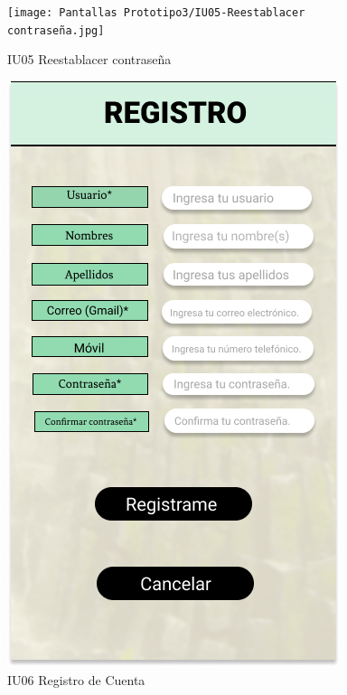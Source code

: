 \begin{figure}[h]
    \begin{minipage}{0.5\textwidth}
        \centering
        \texttt{[image: Pantallas Prototipo3/IU05-Reestablacer contraseña.jpg]}
        \caption{IU05 Reestablacer contraseña}
    \end{minipage}
    
    \begin{minipage}{0.5\textwidth}
        \centering
        \includegraphics[width=.7\linewidth]{Pantallas Prototipo3/IU06-Registro de Cuenta.jpg}
        \caption{IU06 Registro de Cuenta}
    \end{minipage}%
\end{figure}

